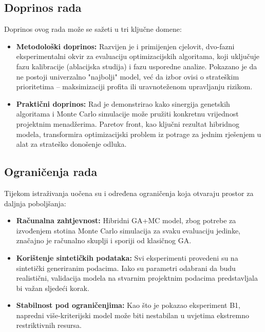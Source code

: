 \subsection{Doprinos rada}
Doprinos ovog rada može se sažeti u tri ključne domene:
\begin{itemize}
    \item \textbf{Metodološki doprinos:} Razvijen je i primijenjen cjelovit, dvo-fazni eksperimentalni okvir za evaluaciju optimizacijskih algoritama, koji uključuje fazu kalibracije (ablacijska studija) i fazu usporedne analize. Pokazano je da ne postoji univerzalno "najbolji" model, već da izbor ovisi o strateškim prioritetima – maksimizaciji profita ili uravnoteženom upravljanju rizikom.
    \item \textbf{Praktični doprinos:} Rad je demonstrirao kako sinergija genetskih algoritama i Monte Carlo simulacije može pružiti konkretnu vrijednost projektnim menadžerima. Paretov front, kao ključni rezultat hibridnog modela, transformira optimizacijski problem iz potrage za jednim rješenjem u alat za strateško donošenje odluka.
\end{itemize}

\subsection{Ograničenja rada}
Tijekom istraživanja uočena su i određena ograničenja koja otvaraju prostor za daljnja poboljšanja:
\begin{itemize}
    \item \textbf{Računalna zahtjevnost:} Hibridni GA+MC model, zbog potrebe za izvođenjem stotina Monte Carlo simulacija za svaku evaluaciju jedinke, značajno je računalno skuplji i sporiji od klasičnog GA.
    \item \textbf{Korištenje sintetičkih podataka:} Svi eksperimenti provedeni su na sintetički generiranim podacima. Iako su parametri odabrani da budu realistični, validacija modela na stvarnim projektnim podacima predstavljala bi važan sljedeći korak.
    \item \textbf{Stabilnost pod ograničenjima:} Kao što je pokazao eksperiment B1, napredni više-kriterijski model može biti nestabilan u uvjetima ekstremno restriktivnih resursa.
\end{itemize}

